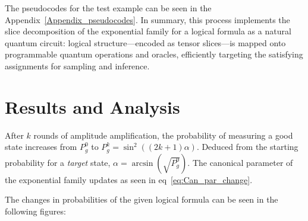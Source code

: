 \documentclass[encoding=utf8,british]{tumphthesis}
\begin{document}
        The pseudocodes for the test example can be seen in the Appendix~\ref{Appendix_pseudocodes}.
        In summary, this process implements the slice decomposition of the exponential family for a logical formula as a natural quantum circuit: logical structure—encoded as tensor 
        slices—is mapped onto programmable quantum operations and oracles, efficiently targeting the satisfying assignments for sampling and inference.

        \section{Results and Analysis}
        \label{sect:EE_Results}
            After $k$ rounds of amplitude amplification, the probability of measuring a good state increases from $P_g^0$ to $P_g^k = \sin^2((2k + 1)\alpha)$.
            Deduced from the starting probability for a \textit{target} state, $\alpha = \arcsin(\sqrt{P_g^0})$.
            The canonical parameter of the exponential family updates as seen in eq~\ref{eq:Can_par_change}.

            The changes in probabilities of the given logical formula can be seen in the following figures:
\end{document}
